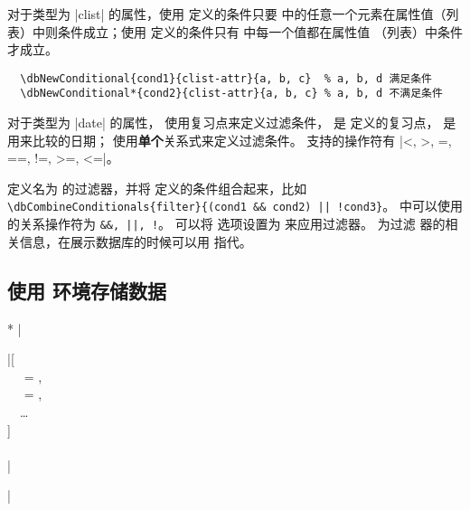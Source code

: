 \documentclass[full]{l3doc}
\begin{document}
\begin{documentation}
  对于类型为 |clist| 的属性，使用  定义的条件只要
   中的任意一个元素在属性值（列表）中则条件成立；使用
   定义的条件只有  中每一个值都在属性值
  （列表）中条件才成立。

\begin{verbatim}
  \dbNewConditional{cond1}{clist-attr}{a, b, c}  % a, b, d 满足条件
  \dbNewConditional*{cond2}{clist-attr}{a, b, c} % a, b, d 不满足条件
\end{verbatim}

  对于类型为 |date| 的属性， 使用复习点来定义过滤条件，
   是  定义的复习点， 是
  用来比较的日期； 使用\textbf{单个}关系式来定义过滤条件。
  支持的操作符有 |<, >, =, ==, !=, >=, <=|。

\begin{function}{\dbCombineConditionals}
  \begin{syntax}
       
  \end{syntax}

   定义名为  的过滤器，并将
   定义的条件组合起来，比如
  \verb=\dbCombineConditionals{filter}{(cond1 && cond2) || !cond3}=。
   中可以使用的关系操作符为 \verb=&&, ||, !=。
  可以将  选项设置为  来应用过滤器。 为过滤
  器的相关信息，在展示数据库的时候可以用  指代。
\end{function}

\subsection{使用  环境存储数据}

\noindent{}
\begin{Syntax}*
  |\begin{dbitem}|[ \\
  ~~ = , \\
  ~~ = , \\
  ~~\ldots{} \\
  ] \\
  ~~ \\
  |\end{dbitem}|
\end{Syntax}


\end{documentation}
\end{document}
